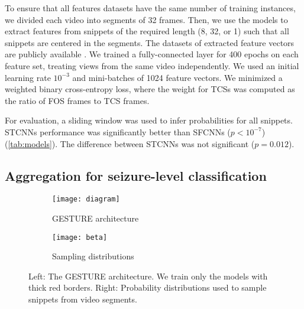 To ensure that all features datasets have the same number of training instances, we divided each video into segments of 32 frames.
Then, we use the models to extract features from snippets of the required length (8, 32, or 1) such that all snippets are centered in the segments.
The datasets of extracted feature vectors are publicly available \cite{perez-garcia_data_2021}.
We trained a fully-connected layer for 400 epochs on each feature set, treating views from the same video independently.
We used an initial learning rate $10 ^ {-3}$ and mini-batches of 1024 feature vectors.
We minimized a weighted binary cross-entropy loss,
where the weight for \acp{TCS} was computed as the ratio of \ac{FOS} frames to \ac{TCS} frames.

For evaluation, a sliding window was used to infer probabilities for all snippets.
\acp{STCNN} performance was significantly better than \acp{SFCNN} ($p < 10 ^ {-7}$) (\cref{tab:models}).
The difference between \acp{STCNN} was not significant ($p = 0.012$).


\subsection{Aggregation for seizure-level classification}
\label{sec:exp_agg}

\begin{figure}[t!]
    \centering
    \begin{subfigure}[b]{0.49\textwidth}
        \centering
        \texttt{[image: diagram]}
        \caption{\ac{GESTURE} architecture}
        \label{fig:diagram}
    \end{subfigure}
    \hfill
    \begin{subfigure}[b]{0.49\textwidth}
        \centering
        \texttt{[image: beta]}
        \caption{Sampling distributions}
        \label{fig:betas}
    \end{subfigure}
    \caption{%
        Left: The \ac{GESTURE} architecture.
        We train only the models with thick red borders.
        Right: Probability distributions used to sample snippets from video segments.
    }
    \label{fig:diagram_betas}
\end{figure}

